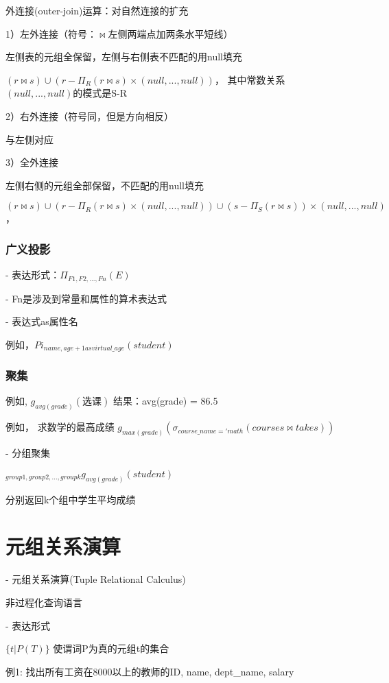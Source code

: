 \documentclass{article}        %
\begin{document}
外连接(outer-join)运算：对自然连接的扩充 

1）左外连接（符号：$\bowtie$左侧两端点加两条水平短线）

左侧表的元组全保留，左侧与右侧表不匹配的用null填充 

$(r\bowtie s)\cup (r-\Pi_R(r\bowtie s)\times(null,...,null))$，
其中常数关系$(null,...,null)$的模式是S-R

2）右外连接（符号同，但是方向相反） 

与左侧对应 

3）全外连接 

左侧右侧的元组全部保留，不匹配的用null填充

$(r\bowtie s)\cup (r-\Pi_R(r\bowtie s)\times(null,...,null)) \cup (s-\Pi_S(r\bowtie s))\times (null,...,null)$，

\subsubsection{广义投影}

- 表达形式：$\Pi_{F1,F2,...,Fn}(E) $

- Fn是涉及到常量和属性的算术表达式 

- 表达式as属性名 

例如，${Pi_{name,age+1 as virtual\_age}(student)}$

\subsubsection{聚集}

例如, 
$g_{avg(grade)}(选课)$ 
结果：avg(grade) = 86.5

例如，
求数学的最高成绩
$g_{max(grade)}(\sigma_{course\_name='math}(courses\bowtie takes)) $

- 分组聚集 

$_{group1, group2, ..., group k}g_{avg(grade)}(student)$ 

分别返回k个组中学生平均成绩

\section{元组关系演算}

- 元组关系演算(Tuple Relational Calculus) 

非过程化查询语言

- 表达形式

$ \{t | P(T) \} $ 使谓词P为真的元组t的集合 

例1: 找出所有工资在8000以上的教师的ID, name, dept\_name, salary 
\end{document}

